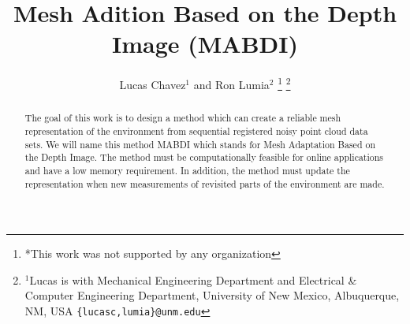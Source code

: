 \documentclass[letterpaper, 10 pt, conference]{ieeeconf}  %
\title{\LARGE \bf
Mesh Adition Based on the Depth Image (MABDI)
}
\author{Lucas Chavez$^{1}$ and Ron Lumia$^{2}$%
\thanks{*This work was not supported by any organization}%
\thanks{$^{1}$Lucas is with Mechanical Engineering Department and Electrical \& Computer Engineering Department, University of New Mexico,
	Albuquerque, NM, USA
        {\tt\small \{lucasc,lumia\}@unm.edu}}%
}
\begin{document}
\maketitle
\thispagestyle{empty}
\pagestyle{empty}


\begin{abstract}


The goal of this work is to design a method which can create a reliable
mesh representation of the environment from sequential registered noisy
point cloud data sets. We will name this method MABDI which stands for Mesh
Adaptation Based on the Depth Image. The method must be computationally
feasible for online applications and have a low memory requirement. In
addition, the method must update the representation when new measurements of
revisited parts of the environment are made.

\end{abstract}



% 

% 

% 

% 

% 




\end{document}
